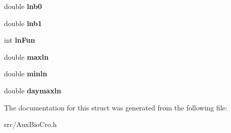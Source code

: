 \begin{DoxyCompactItemize}
\item 
\hypertarget{structnitro_parms_ae6dbabdbc8f409b7ab5ccc72fadd28b5}{double {\bfseries lnb0}}\label{structnitro_parms_ae6dbabdbc8f409b7ab5ccc72fadd28b5}

\item 
\hypertarget{structnitro_parms_a63d99f8f03faab96acd071930567e6cd}{double {\bfseries lnb1}}\label{structnitro_parms_a63d99f8f03faab96acd071930567e6cd}

\item 
\hypertarget{structnitro_parms_ae2b2a599cac4351ebe84528864c94a5b}{int {\bfseries ln\-Fun}}\label{structnitro_parms_ae2b2a599cac4351ebe84528864c94a5b}

\item 
\hypertarget{structnitro_parms_ac7653f7b33daecc89fd9784019fe5eca}{double {\bfseries maxln}}\label{structnitro_parms_ac7653f7b33daecc89fd9784019fe5eca}

\item 
\hypertarget{structnitro_parms_a19d57dfee39722d51b31ca49e1317a80}{double {\bfseries minln}}\label{structnitro_parms_a19d57dfee39722d51b31ca49e1317a80}

\item 
\hypertarget{structnitro_parms_abc26657e9e02d0f907582ce50c40d3f0}{double {\bfseries daymaxln}}\label{structnitro_parms_abc26657e9e02d0f907582ce50c40d3f0}

\end{DoxyCompactItemize}


The documentation for this struct was generated from the following file\-:\begin{DoxyCompactItemize}
\item 
src/Aux\-Bio\-Cro.\-h\end{DoxyCompactItemize}
